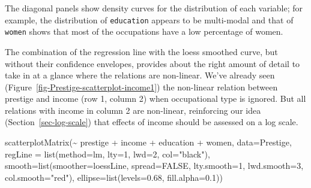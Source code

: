 \documentclass[
  letterpaper,
  10pt,
  krantz2]{krantz}
\makeatletter
\newenvironment{Shaded}{\begin{snugshade}}{\end{snugshade}}
\newcommand{\AttributeTok}[1]{\textcolor[rgb]{0.40,0.45,0.13}{#1}}
\newcommand{\ConstantTok}[1]{\textcolor[rgb]{0.56,0.35,0.01}{#1}}
\newcommand{\DecValTok}[1]{\textcolor[rgb]{0.68,0.00,0.00}{#1}}
\newcommand{\FloatTok}[1]{\textcolor[rgb]{0.68,0.00,0.00}{#1}}
\newcommand{\FunctionTok}[1]{\textcolor[rgb]{0.28,0.35,0.67}{#1}}
\newcommand{\NormalTok}[1]{\textcolor[rgb]{0.00,0.23,0.31}{#1}}
\newcommand{\SpecialCharTok}[1]{\textcolor[rgb]{0.37,0.37,0.37}{#1}}
\newcommand{\StringTok}[1]{\textcolor[rgb]{0.13,0.47,0.30}{#1}}
\newenvironment{kframe}{%
  \medskip{}
  \setlength{\fboxsep}{.8em}
  \def\at@end@of@kframe{}%
  \ifinner\ifhmode%
  \def\at@end@of@kframe{\end{minipage}}%
  \begin{minipage}{\columnwidth}%
  \fi\fi%
  \def\FrameCommand##1{\hskip\@totalleftmargin \hskip-\fboxsep
  \colorbox{shadecolor}{##1}\hskip-\fboxsep
      \hskip-\linewidth \hskip-\@totalleftmargin \hskip\columnwidth}%
  \MakeFramed {\advance\hsize-\width
    \@totalleftmargin\z@ \linewidth\hsize
    \@setminipage}}%
{\par\unskip\endMakeFramed%
  \at@end@of@kframe}
\renewenvironment{Shaded}{\begin{kframe}}{\end{kframe}}
\makeatother
\begin{document}
The diagonal panels show density curves for the distribution of each
variable; for example, the distribution of \texttt{education} appears to
be multi-modal and that of \texttt{women} shows that most of the
occupations have a low percentage of women.

The combination of the regression line with the loess smoothed curve,
but without their confidence envelopes, provides about the right amount
of detail to take in at a glance where the relations are non-linear.
We've already seen (Figure~\ref{fig-Prestige-scatterplot-income1}) the
non-linear relation between prestige and income (row 1, column 2) when
occupational type is ignored. But all relations with income in column 2
are non-linear, reinforcing our idea (Section~\ref{sec-log-scale}) that
effects of income should be assessed on a log scale.

\begin{Shaded}
\begin{Highlighting}[]
\FunctionTok{scatterplotMatrix}\NormalTok{(}\SpecialCharTok{\textasciitilde{}}\NormalTok{ prestige }\SpecialCharTok{+}\NormalTok{ income }\SpecialCharTok{+}\NormalTok{ education }\SpecialCharTok{+}\NormalTok{ women,}
  \AttributeTok{data=}\NormalTok{Prestige,}
  \AttributeTok{regLine =} \FunctionTok{list}\NormalTok{(}\AttributeTok{method=}\NormalTok{lm, }\AttributeTok{lty=}\DecValTok{1}\NormalTok{, }\AttributeTok{lwd=}\DecValTok{2}\NormalTok{, }\AttributeTok{col=}\StringTok{"black"}\NormalTok{),}
  \AttributeTok{smooth=}\FunctionTok{list}\NormalTok{(}\AttributeTok{smoother=}\NormalTok{loessLine, }\AttributeTok{spread=}\ConstantTok{FALSE}\NormalTok{,}
              \AttributeTok{lty.smooth=}\DecValTok{1}\NormalTok{, }\AttributeTok{lwd.smooth=}\DecValTok{3}\NormalTok{, }\AttributeTok{col.smooth=}\StringTok{"red"}\NormalTok{),}
  \AttributeTok{ellipse=}\FunctionTok{list}\NormalTok{(}\AttributeTok{levels=}\FloatTok{0.68}\NormalTok{, }\AttributeTok{fill.alpha=}\FloatTok{0.1}\NormalTok{))}
\end{Highlighting}
\end{Shaded}
\end{document}
